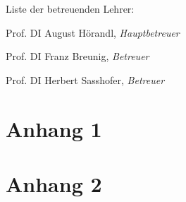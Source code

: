 \documentclass[a4paper,ngerman,naustrian,DIV=12,BCOR=1cm]{scrbook}
\begin{document}
\vspace{10mm}


\noindent Liste der betreuenden Lehrer:

Prof. DI August Hörandl, \textit{Hauptbetreuer}

Prof. DI Franz Breunig, \textit{Betreuer}

Prof. DI Herbert Sasshofer, \textit{Betreuer}

\vspace{10mm}

\renewcommand*{\chapterpagestyle}{fancy}
\cleardoublepage{}
\tableofcontents{}
\cleardoublepage{}
\listoftables
\cleardoublepage{}
\listoffigures

\cleardoublepage{}

\pagestyle{fancy}
\thispagestyle{fancy}












\renewcommand{\kapitelautor}{}

\appendix


\chapter{Anhang 1\label{appendix1}}

\cleardoublepage


\chapter{Anhang 2\label{appendix2}}

\cleardoublepage

\end{document}
